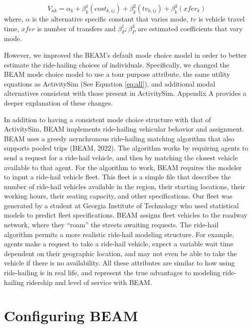 \documentclass[simple, masters, twoside]{byuthesis}
\begin{document}
\begin{equation}
  V_{nk} = \alpha_{k} + \beta_k^1(cost_{k,ij}) + \beta_k^2(tv_{k,ij}) + \beta_k^3(xfer_{k}) \label{eq:beam}
\end{equation}
where, \(\alpha\) is the alternative specific constant that varies mode, \(tv\) is vehicle travel time, \(xfer\) is number of transfers and \(\beta_{P}^1:\beta_{P}^{3}\) are estimated coefficients that vary mode.

However, we improved the BEAM's default mode choice model in order to better estimate the ride-hailing choices of individuals. Specifically, we changed the BEAM mode choice model to use a tour purpose attribute, the same utility equations as ActivitySim (See Equation \eqref{eq:all}), and additional modal alternatives consistent with those present in ActivitySim. Appendix A provides a deeper explanation of these changes.

In addition to having a consistent mode choice structure with that of ActivitySim, BEAM implements ride-hailing vehicular behavior and assignment. BEAM uses a greedy asynchronous ride-hailing matching algorithm that also supports pooled trips (BEAM, 2022). The algorithm works by requiring agents to send a request for a ride-hail vehicle, and then by matching the closest vehicle available to that agent. For the algorithm to work, BEAM requires the modeler to input a ride-hail vehicle fleet. This fleet is a simple file that describes the number of ride-hail vehicles available in the region, their starting locations, their working hours, their seating capacity, and other specifications. Our fleet was generated by a student at Georgia Institute of Technology who used statistical models to predict fleet specifications. BEAM assigns fleet vehicles to the roadway network, where they ``roam'' the streets awaiting requests. The ride-hail algorithm permits a more realistic ride-hail modeling structure. For example, agents make a request to take a ride-hail vehicle, expect a variable wait time dependent on their geographic location, and may not even be able to take the vehicle if there is no availability. All these attributes are similar to how using ride-hailing is in real life, and represent the true advantages to modeling ride-hailing ridership and level of service with BEAM.

\hypertarget{configuring-beam}{%
\section{Configuring BEAM}\label{configuring-beam}}
\end{document}
